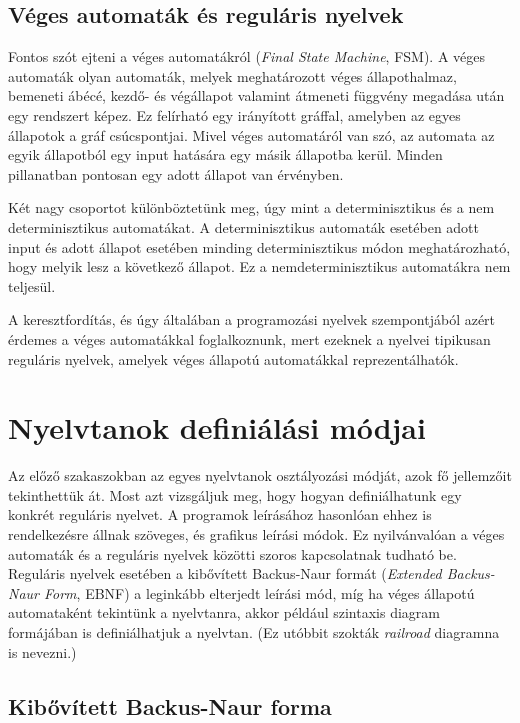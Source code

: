 \subsection{Véges automaták és reguláris nyelvek}

Fontos szót ejteni a véges automatákról (\textit{Final State Machine}, FSM). A véges automaták olyan automaták, melyek meghatározott véges állapothalmaz, bemeneti ábécé, kezdő- és végállapot valamint átmeneti függvény megadása után egy rendszert képez. Ez felírható egy irányított gráffal, amelyben az egyes állapotok a gráf csúcspontjai. Mivel véges automatáról van szó, az automata az egyik állapotból egy input hatására egy másik állapotba kerül. Minden pillanatban pontosan egy adott állapot van érvényben.

Két nagy csoportot különböztetünk meg, úgy mint a determinisztikus és a nem determinisztikus automatákat.
A determinisztikus automaták esetében adott input és adott állapot esetében minding determinisztikus módon meghatározható, hogy melyik lesz a következő állapot. Ez a nemdeterminisztikus automatákra nem teljesül.

A keresztfordítás, és úgy általában a programozási nyelvek szempontjából azért érdemes a véges automatákkal foglalkoznunk, mert ezeknek a nyelvei tipikusan reguláris nyelvek, amelyek véges állapotú automatákkal reprezentálhatók.

\section{Nyelvtanok definiálási módjai}

Az előző szakaszokban az egyes nyelvtanok osztályozási módját, azok fő jellemzőit tekinthettük át.
Most azt vizsgáljuk meg, hogy hogyan definiálhatunk egy konkrét reguláris nyelvet.
A programok leírásához hasonlóan ehhez is rendelkezésre állnak szöveges, és grafikus leírási módok.
Ez nyilvánvalóan a véges automaták és a reguláris nyelvek közötti szoros kapcsolatnak tudható be.
Reguláris nyelvek esetében a kibővített Backus-Naur formát (\textit{Extended Backus-Naur Form}, EBNF) a leginkább elterjedt leírási mód, míg ha véges állapotú automataként tekintünk a nyelvtanra, akkor például szintaxis diagram formájában is definiálhatjuk a nyelvtan. (Ez utóbbit szokták \textit{railroad} diagramna is nevezni.)

\subsection{Kibővített Backus-Naur forma}

